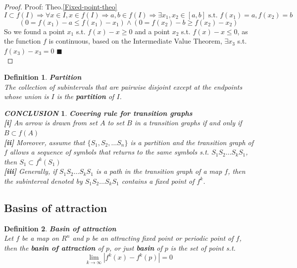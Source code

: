 \documentclass[12pt]{article}
\theoremstyle{plain}
\newtheorem{definition}{{\color{red}\textbf{Definition}}}[section]
\newtheorem{proof}{\textit{PROOF}}[section]
\newtheorem{conclusion}{\textit{\textbf{CONCLUSION}}}[section]
\begin{document}
{\color{blue}
\begin{proof} Proof: Theo.\ref{Fixed-point-theo}
$$
I \subset f(I) \Rightarrow \forall x \in I, x \in f(I) \Rightarrow a, b \in f(I) \Rightarrow \exists x_1, x_2 \in [a, b] \text{ s.t. } f(x_1) = a, f(x_2) = b
$$
$$
\left(0 = f(x_1) - a \leq f(x_1) - x_1\right) \land \left(0 = f(x_2) - b \geq f(x_2) - x_2 \right)
$$
So we found a point $x_1$ s.t. $f(x) - x \geq 0$ and a point $x_2$ s.t. $f(x) - x \leq 0$, as the function $f$ is continuous, based on the Intermediate Value Theorem, $\exists x_3$ s.t. $f(x_3) - x_3 = 0$ $\blacksquare$\\[1ex] 
\end{proof}
}


\begin{definition} \textbf{Partition}
\\\noindent The collection of subintervals that are pairwise disjoint except at the endpoints whose union is $I$ is the \textbf{partition} of $I$.
\end{definition} 

\begin{conclusion}\label{covering-rule-for-tg}\textbf{Covering rule for transition graphs}
\\\noindent \textbf{[i]} An arrow is drawn from set $A$ to set $B$ in a transition graphs if and only if $B \subset f(A)$
\\\noindent \textbf{[ii]} Moreover, assume that $\{S_1, S_2, \ldots S_n\}$ is a partition and the transition graph of $f$ allows a sequence of symbols that returns to the same symbols s.t. $S_1S_2\ldots S_kS_1$, then $S_1 \subset f^k(S_1)$
\\\noindent \textbf{[iii]} Generally, if $S_1S_2\ldots S_{k}S_1$ is a path in the transition graph of a map $f$, then the subinterval denoted by $S_1S_2\ldots S_{k}S_1$ contains a fixed point of $f^k$.
\end{conclusion}









\newpage
\subsection{Basins of attraction}
\begin{definition}\label{basin-of-attraction}\textbf{Basin of attraction}
\\\noindent Let $f$ be a map on $R^n$ and $p$ be an attracting fixed point or periodic point of $f$, then the \textbf{basin of attraction} of $p$, or just \textbf{basin} of $p$ is the set of point s.t. 
$$
\lim_{k \rightarrow \infty}\left|f^k(x) - f^k(p)\right| = 0
$$

\end{definition}
\end{document}
